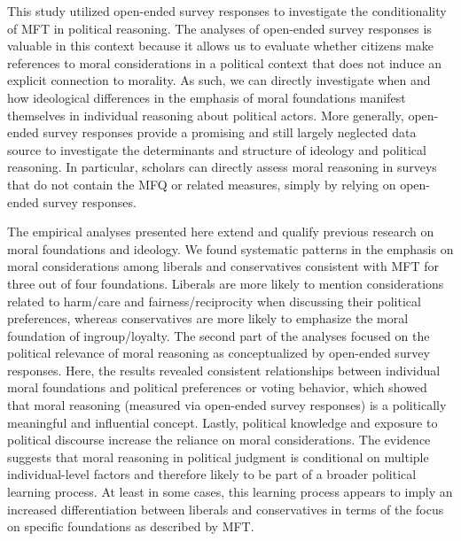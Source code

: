 \documentclass[12pt]{article}
\begin{document}
This study utilized open-ended survey responses to investigate the conditionality of MFT in political reasoning. The analyses of open-ended survey responses is valuable in this context because it allows us to evaluate whether citizens make references to moral considerations in a political context that does not induce an explicit connection to morality. As such, we can directly investigate when and how ideological differences in the emphasis of moral foundations manifest themselves in individual reasoning about political actors. More generally, open-ended survey responses provide a promising and still largely neglected data source to investigate the determinants and structure of ideology and political reasoning. In particular, scholars can directly assess moral reasoning in surveys that do not contain the MFQ or related measures, simply by relying on open-ended survey responses.

The empirical analyses presented here extend and qualify previous research on moral foundations and ideology. We found systematic patterns in the emphasis on moral considerations among liberals and conservatives consistent with MFT for three out of four foundations. Liberals are more likely to mention considerations related to harm/care and fairness/reciprocity when discussing their political preferences, whereas conservatives are more likely to emphasize the moral foundation of ingroup/loyalty. The second part of the analyses focused on the political relevance of moral reasoning as conceptualized by open-ended survey responses. Here, the results revealed consistent relationships between individual moral foundations and political preferences or voting behavior, which showed that moral reasoning (measured via open-ended survey responses) is a politically meaningful and influential concept. Lastly, political knowledge and exposure to political discourse increase the reliance on moral considerations. The evidence suggests that moral reasoning in political judgment is conditional on multiple individual-level factors and therefore likely to be part of a broader political learning process. At least in some cases, this learning process appears to imply an increased differentiation between liberals and conservatives in terms of the focus on specific foundations as described by MFT.
\end{document}
